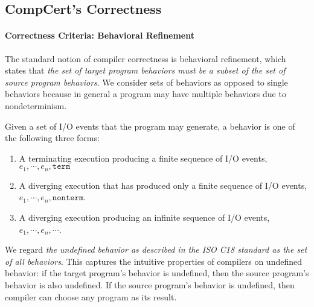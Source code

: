 \subsection{CompCert's Correctness}
\label{sec:background:correctness}

\paragraph{Correctness Criteria: Behavioral Refinement}

The standard notion of compiler correctness is behavioral refinement, which states that \emph{the
  set of target program behaviors must be a subset of the set of source program behaviors}.  We
consider sets of behaviors as opposed to single behaviors because in general a program may have
multiple behaviors due to nondeterminism.

Given a set of I/O events that the program may generate, a behavior is one of the following three
forms:
\begin{enumerate}
\item A terminating execution producing a finite sequence of I/O events,
  $e_1, \cdots, e_n, \mathtt{term}$
\item A diverging execution that has produced only a finite sequence of I/O events,
  $e_1, \cdots, e_n, \mathtt{nonterm}$.
\item A diverging execution producing an infinite sequence of I/O events,
  $e_1, \cdots, e_n, \cdots$.
\end{enumerate}

We regard \emph{the undefined behavior as described in the ISO C18 standard as the set of all
  behaviors}.  This captures the intuitive properties of compilers on undefined behavior: if the
target program's behavior is undefined, then the source program's behavior is also undefined.  If
the source program's behavior is undefined, then compiler can choose any program as its result.


